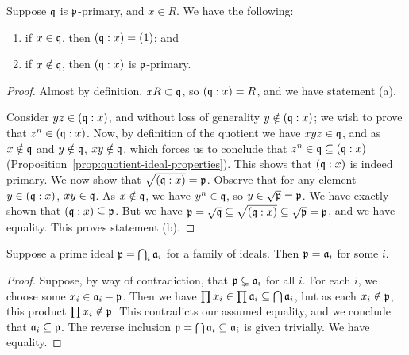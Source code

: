 \begin{lemma}\label{lem:quotient-primary}
    Suppose \(\mathfrak{q}\) is \(\mathfrak{p}\)-primary, and \(x \in R\).
    We have the following:
    \begin{enumerate}[label={(\alph*)}, itemsep=0mm]
        \item if \(x \in \mathfrak{q}\), then \((\mathfrak{q}:x) = (1)\); and
        \item if \(x \notin \mathfrak{q}\), then \((\mathfrak{q}:x)\) is \(\mathfrak{p}\)-primary.
    \end{enumerate}
\end{lemma}
\begin{proof}
    Almost by definition, \(xR \subset \mathfrak{q}\),
    so \((\mathfrak{q}:x) = R\), and we have statement (a).

    Consider \(yz \in (\mathfrak{q}:x)\), and without loss of generality \(y \notin (\mathfrak{q}:x)\);
    we wish to prove that \(z^n \in (\mathfrak{q}:x)\).
    Now, by definition of the quotient we have \(xyz \in \mathfrak{q}\),
    and as \(x \notin \mathfrak{q}\) and \(y \notin \mathfrak{q}\), \(xy \notin \mathfrak{q}\),
    which forces us to conclude that \(z^n \in \mathfrak{q} \subseteq (\mathfrak{q}:x)\)
    (Proposition~\ref{prop:quotient-ideal-properties}).
    This shows that \((\mathfrak{q}:x)\) is indeed primary.
    We now show that \(\sqrt{(\mathfrak{q}:x)} = \mathfrak{p}\).
    Observe that for any element \(y \in (\mathfrak{q}:x)\), \(xy \in \mathfrak{q}\).
    As \(x \notin \mathfrak{q}\), we have \(y^n \in \mathfrak{q}\), so \(y \in \sqrt{\mathfrak{p}} = \mathfrak{p}\).
    We have exactly shown that \((\mathfrak{q}:x) \subseteq \mathfrak{p}\).
    But we have \(\mathfrak{p} = \sqrt{\mathfrak{q}} \subseteq \sqrt{(\mathfrak{q}:x)} \subseteq \sqrt{\mathfrak{p}} = \mathfrak{p}\),
    and we have equality.
    This proves statement (b).
\end{proof}
\begin{lemma}\label{lem:prime-intersection}
    Suppose a prime ideal \(\mathfrak{p} = \bigcap_i \mathfrak{a}_i\) for a family of ideals.
    Then \(\mathfrak{p} = \mathfrak{a}_i\) for some \(i\).
\end{lemma}
\begin{proof}
    Suppose, by way of contradiction, that \(\mathfrak{p} \subsetneq \mathfrak{a}_i\) for all \(i\).
    For each \(i\), we choose some \(x_i \in \mathfrak{a}_i - \mathfrak{p}\).
    Then we have \(\prod x_i \in \prod \mathfrak{a}_i \subseteq \bigcap \mathfrak{a}_i\),
    but as each \(x_i \notin \mathfrak{p}\), this product \(\prod x_i \notin \mathfrak{p}\).
    This contradicts our assumed equality,
    and we conclude that \(\mathfrak{a}_i \subseteq \mathfrak{p}\).
    The reverse inclusion \(\mathfrak{p} = \bigcap \mathfrak{a}_i \subseteq \mathfrak{a}_i\) is given trivially.
    We have equality.
\end{proof}
